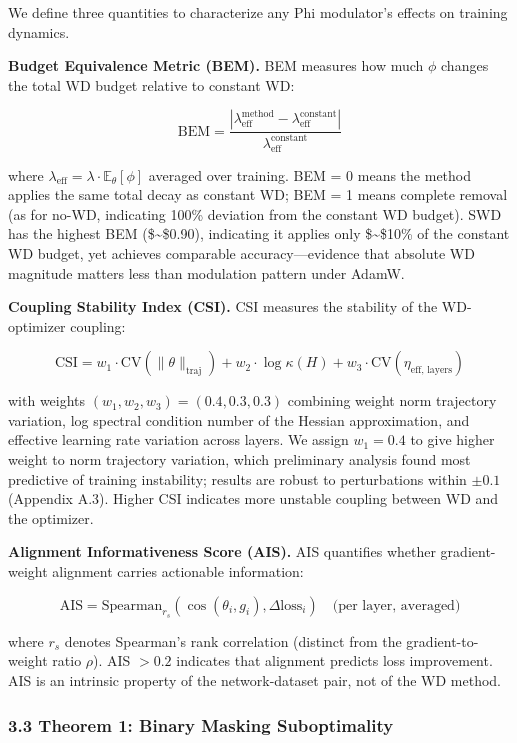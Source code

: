 \documentclass[
]{article}
\begin{document}
We define three quantities to characterize any Phi modulator's effects
on training dynamics.

\textbf{Budget Equivalence Metric (BEM).} BEM measures how much \(\phi\)
changes the total WD budget relative to constant WD:

\[\text{BEM} = \frac{|\lambda_{\text{eff}}^{\text{method}} - \lambda_{\text{eff}}^{\text{constant}}|}{\lambda_{\text{eff}}^{\text{constant}}}\]

where \(\lambda_{\text{eff}} = \lambda \cdot \mathbb{E}_\theta[\phi]\)
averaged over training. BEM = 0 means the method applies the same total
decay as constant WD; BEM = 1 means complete removal (as for no-WD,
indicating 100\% deviation from the constant WD budget). SWD has the
highest BEM (\$\sim\$0.90), indicating it applies only \$\sim\$10\% of
the constant WD budget, yet achieves comparable accuracy---evidence that
absolute WD magnitude matters less than modulation pattern under AdamW.

\textbf{Coupling Stability Index (CSI).} CSI measures the stability of
the WD-optimizer coupling:

\[\text{CSI} = w_1 \cdot \text{CV}(\|\theta\|_{\text{traj}}) + w_2 \cdot \log\kappa(H) + w_3 \cdot \text{CV}(\eta_{\text{eff, layers}})\]

with weights \((w_1, w_2, w_3) = (0.4, 0.3, 0.3)\) combining weight norm
trajectory variation, log spectral condition number of the Hessian
approximation, and effective learning rate variation across layers. We
assign \(w_1 = 0.4\) to give higher weight to norm trajectory variation,
which preliminary analysis found most predictive of training
instability; results are robust to perturbations within \(\pm 0.1\)
(Appendix A.3). Higher CSI indicates more unstable coupling between WD
and the optimizer.

\textbf{Alignment Informativeness Score (AIS).} AIS quantifies whether
gradient-weight alignment carries actionable information:

\[\text{AIS} = \text{Spearman}_{r_s}(\cos(\theta_i, g_i), \Delta\text{loss}_i) \quad \text{(per layer, averaged)}\]

where \(r_s\) denotes Spearman's rank correlation (distinct from the
gradient-to-weight ratio \(\rho\)). AIS \(> 0.2\) indicates that
alignment predicts loss improvement. AIS is an intrinsic property of the
network-dataset pair, not of the WD method.

\hypertarget{theorem-1-binary-masking-suboptimality}{%
\subsubsection{3.3 Theorem 1: Binary Masking
Suboptimality}\label{theorem-1-binary-masking-suboptimality}}
\end{document}
